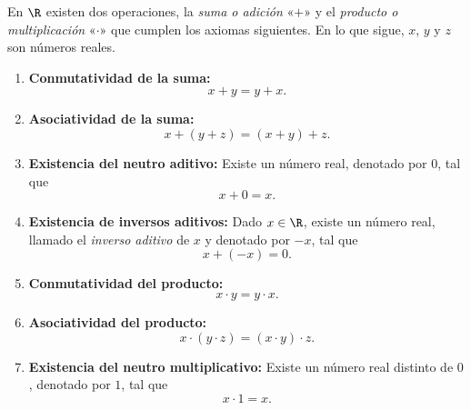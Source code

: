 \documentclass[12pt,a4paper]{book}
\begin{document}
    En $\R$ existen dos operaciones, la \textit{suma o adición} «$+$» y el \textit{producto o
    multiplicación} «$\cdot$» que cumplen los axiomas siguientes. En lo que sigue, $x$, $y$
    y $z$ son números reales.
    \begin{enumerate}[label=\arabic*.,series=axiomas]
        \item \textbf{Conmutatividad de la suma:}
        \begin{equation*}
            x+y=y+x.
        \end{equation*}
        \item \textbf{Asociatividad de la suma:}
        \begin{equation*}
            x+(y+z)=(x+y)+z.
        \end{equation*}
        \item \textbf{Existencia del neutro aditivo:} Existe un número real, denotado por $0$,
        tal que
        \begin{equation*}
            x+0=x.
        \end{equation*}
        \item \textbf{Existencia de inversos aditivos:} Dado $x\in\R$, existe un número real,
        llamado el \textit{inverso aditivo} de $x$ y denotado por $-x$, tal que
        \begin{equation*}
            x+(-x)=0.
        \end{equation*}
        \item \textbf{Conmutatividad del producto:}
        \begin{equation*}
            x\cdot y=y\cdot x.
        \end{equation*}
        \item \textbf{Asociatividad del producto:}
        \begin{equation*}
            x\cdot(y\cdot z)=(x\cdot y)\cdot z.
        \end{equation*}
        \item \textbf{Existencia del neutro multiplicativo:} Existe un número real distinto
        de $0$, denotado por $1$, tal que
        \begin{equation*}
            x\cdot 1=x.
        \end{equation*}

\end{enumerate}
\end{document}
